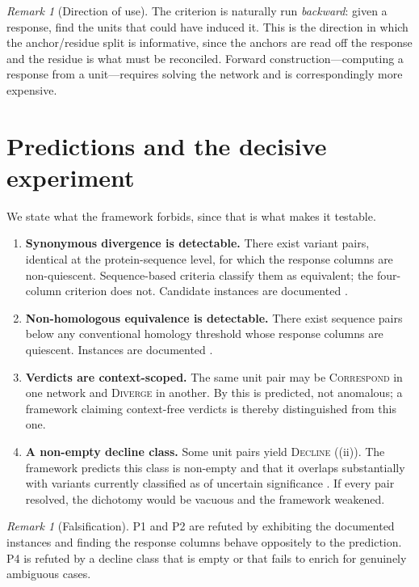 \documentclass[11pt,twocolumn,a4paper]{article}
\theoremstyle{definition}
\theoremstyle{remark}
\newtheorem{remark}[theorem]{Remark}
\begin{document}
\begin{remark}[Direction of use]
\label{rem:direction}
The criterion is naturally run \emph{backward}: given a response, find the
units that could have induced it. This is the direction in which the
anchor/residue split is informative, since the anchors are read off the
response and the residue is what must be reconciled. Forward
construction---computing a response from a unit---requires solving the
network and is correspondingly more expensive.
\end{remark}

\section{Predictions and the decisive experiment}
\label{sec:predictions}

We state what the framework forbids, since that is what makes it testable.

\begin{enumerate}[label=\textbf{P\arabic*.},leftmargin=2.8em]
  \item \textbf{Synonymous divergence is detectable.} There exist variant
  pairs, identical at the protein-sequence level, for which the response
  columns are non-quiescent. Sequence-based criteria classify them as
  equivalent; the four-column criterion does not. Candidate instances are
  documented \citep{kimchi2007,sauna2011}.
  \item \textbf{Non-homologous equivalence is detectable.} There exist
  sequence pairs below any conventional homology threshold whose response
  columns are quiescent. Instances are documented
  \citep{galperin1998,omelchenko2010}.
  \item \textbf{Verdicts are context-scoped.} The same unit pair may be
  \textsc{Correspond} in one network and \textsc{Diverge} in another. By
   this is predicted, not anomalous; a framework
  claiming context-free verdicts is thereby distinguished from this one.
  \item \textbf{A non-empty decline class.} Some unit pairs yield
  \textsc{Decline} ((ii)). The framework predicts this
  class is non-empty and that it overlaps substantially with variants
  currently classified as of uncertain significance
  \citep{richards2015,landrum2018,hoffman2019}. If every pair resolved,
  the dichotomy would be vacuous and the framework weakened.
\end{enumerate}

\begin{remark}[Falsification]
\label{rem:falsify}
P1 and P2 are refuted by exhibiting the documented instances and finding
the response columns behave oppositely to the prediction. P4 is refuted by
a decline class that is empty or that fails to enrich for genuinely
ambiguous cases.
\end{remark}
\end{document}
